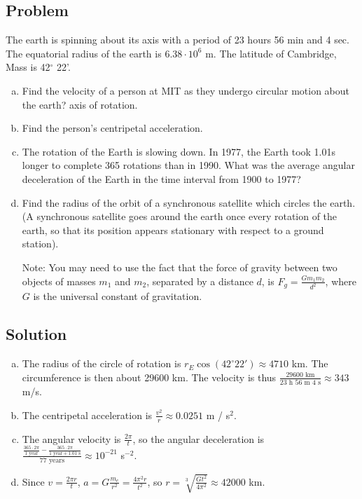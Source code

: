 \documentclass[solutions]{esg8012pset}
\begin{document}
\subsection*{Problem}
  The earth is spinning about its axis with a period of 23 hours 56 min and 4 sec. The equatorial radius of the earth is $6.38\cdot 10^{6}$ m. The latitude of Cambridge, Mass is 42$^{\circ}$ 22'.
  \begin{enumerate}[a)]
    \item Find the velocity of a person at MIT as they undergo circular motion about the earth? axis of rotation.
    \item Find the person's centripetal acceleration.
    \item The rotation of the Earth is slowing down. In 1977, the Earth took 1.01s longer to complete 365 rotations than in 1990. What was the average angular deceleration of the Earth in the time interval from 1900 to 1977?
    \item Find the radius of the orbit of a synchronous satellite which circles the earth. (A synchronous satellite goes around the earth once every rotation of the earth, so that its position appears stationary with respect to a ground station).  \par\noindent
      Note: You may need to use the fact that the force of gravity between two objects of masses $m_1$ and $m_2$, separated by a distance $d$, is $F_g = \frac{G m_1 m_2}{d^2}$, where $G$ is the universal constant of gravitation.
  \end{enumerate}
\subsection*{Solution}
  \begin{enumerate}[a)]
    \item The radius of the circle of rotation is $r_E \cos(42^{\circ} 22') \approx 4710$ km.  The circumference is then about 29600 km.  The velocity is thus $\frac{29600\text{ km}}{23\text{ h }56\text{ m }4\text{ s}} \approx 343$ m/s.
    \item The centripetal acceleration is $\frac{v^2}{r} \approx 0.0251$ m / s$^2$.
    \item The angular velocity is $\frac{2\pi}{t}$, so the angular deceleration is $\frac{\frac{365\cdot 2\pi}{1\text{ year}} - \frac{365\cdot 2\pi}{1\text{ year}+1.01\text{ s}}}{77\text{ years}} \approx 10^{-21}$ s$^{-2}$.
    \item Since $v = \frac{2\pi r}{t}$, $a = G\frac{m_e}{r^2} = \frac{4\pi^2 r}{t^2}$, so $r = \sqrt[3]{\frac{G t^2}{4\pi^2}} \approx 42000$ km.
  \end{enumerate}
\end{document}
